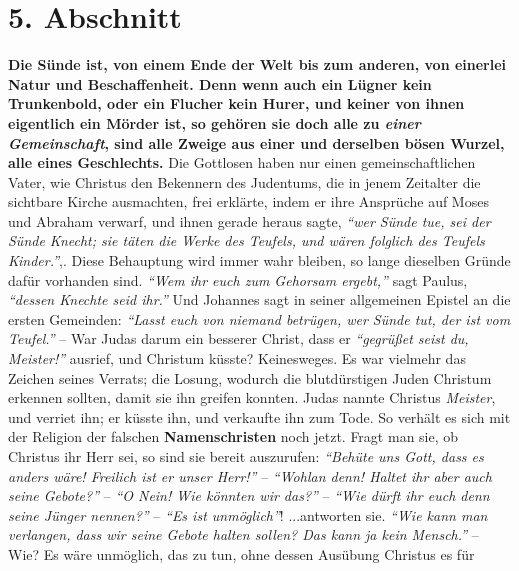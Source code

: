 \section{5. Abschnitt} \label{kap1_ab5}

\label{ref:01_05_in_suende_gleich}
\textbf{Die Sünde
ist, von einem Ende der Welt bis zum anderen, von einerlei Natur und
Beschaffenheit. Denn wenn auch ein Lügner kein Trunkenbold, oder ein Flucher
kein Hurer, und keiner von ihnen eigentlich ein Mörder ist, so gehören sie doch
alle zu \textit{einer Gemeinschaft}, sind alle Zweige aus einer und derselben
bösen Wurzel, alle eines Geschlechts.} Die Gottlosen haben nur einen
gemeinschaftlichen Vater, wie Christus den Bekennern des Judentums, die in
jenem Zeitalter die sichtbare Kirche ausmachten, frei erklärte, indem er ihre
Ansprüche auf Moses und Abraham  
verwarf, und ihnen gerade heraus sagte,
\textit{"`wer Sünde tue, sei der Sünde Knecht; sie täten die Werke des Teufels,
und wären folglich des Teufels Kinder."'},.
Diese Behauptung wird immer wahr bleiben,
so lange dieselben Gründe dafür vorhanden sind.
\textit{"`Wem ihr euch zum Gehorsam ergebt,"'} sagt Paulus, \textit{"`dessen
Knechte seid ihr."'}
Und Johannes sagt in seiner allgemeinen Epistel an die ersten Gemeinden:
\textit{"`Lasst euch von niemand betrügen, wer Sünde tut, der ist vom Teufel."'}
-- War Judas  darum ein besserer Christ, dass er
\textit{"`gegrüßet seist du, Meister!"'} ausrief, und Christum küsste?
Keinesweges. Es war vielmehr das Zeichen seines Verrats;
die Losung, wodurch die blutdürstigen Juden Christum erkennen sollten, damit sie
ihn greifen konnten. Judas nannte Christus \textit{Meister}, und verriet ihn;
er küsste ihn, und verkaufte ihn zum Tode.
So verhält es sich mit der Religion der falschen \textbf{Namenschristen}
 noch jetzt.
Fragt man sie, ob Christus ihr Herr sei,
so sind sie bereit auszurufen:
\textit{"`Behüte uns Gott, dass es anders wäre! Freilich ist er unser Herr!"'}
-- \textit{"`Wohlan denn! Haltet ihr aber auch seine Gebote?"'}
-- \textit{"`O Nein! Wie könnten wir das?"'}
-- \textit{"`Wie dürft ihr euch denn seine Jünger nennen?"'}
-- \textit{"`Es ist unmöglich"'}!
...antworten sie.
\textit{"`Wie kann man verlangen, dass wir seine Gebote halten sollen? Das kann
ja kein Mensch."'}
-- Wie? Es wäre unmöglich, das zu tun, ohne dessen Ausübung Christus es für
